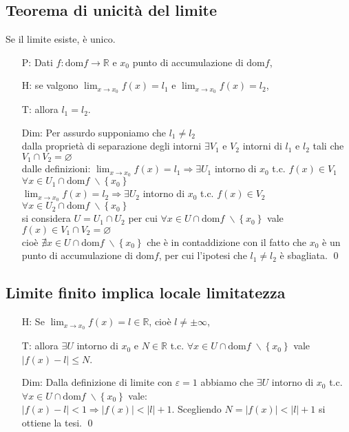 \documentclass[a4paper]{article}
\newcommand\dom{\text{dom}}
\begin{document}
\subsection{Teorema di unicità del limite}
Se il limite esiste, è unico.
\begin{itemize}
	\item[P:] Dati \(f: \dom f \to \mathbb{R}\) e \(x_0\) punto di accumulazione di \(\dom f\),
	\item[H:] se valgono \(\displaystyle \lim_{x \to x_0} f(x) = l_1\) e \(\displaystyle \lim_{x \to x_0} f(x) = l_2\),
	\item[T:] allora \(l_1 = l_2\).
	\item[Dim:] Per assurdo supponiamo che \(l_1 \neq l_2\) \\
	dalla proprietà di separazione degli intorni \(\exists V_1\) e \(V_2\) intorni di \(l_1\) e \(l_2\) tali che \(V_1 \cap V_2 = \varnothing\) \\
	dalle definizioni: \(\lim_{x \to x_0} f(x) = l_1 \Rightarrow \exists U_1\) intorno di \(x_0\) t.c. \(f(x) \in V_1\) \(\forall x \in U_1 \cap \dom f \; \backslash \left\{ x_0 \right\}\) \\
	\(\lim_{x \to x_0} f(x) = l_2 \Rightarrow \exists U_2\) intorno di \(x_0\) t.c. \(f(x) \in V_2\) \(\forall x \in U_2 \cap \dom f \; \backslash \left\{ x_0 \right\}\) \\
	si considera \(U = U_1 \cap U_2\) per cui \(\forall x \in U \cap \dom f \; \backslash \left\{ x_0 \right\}\) vale \(f(x) \in V_1 \cap V_2 = \varnothing\) \\
	cioè \(\nexists x \in U \cap \dom f \; \backslash \left\{ x_0 \right\}\) che è in contaddizione con il fatto che \(x_0\) è un punto di accumulazione di \(\dom f\),
	per cui l'ipotesi che \(l_1 \neq l_2\) è sbagliata. \qed	
\end{itemize}


\subsection{Limite finito implica locale limitatezza}
\begin{itemize}
	\item[H:] Se \(\displaystyle \lim_{x \to x_0} f(x) = l \in \mathbb{R}\), cioè \(l \neq \pm \infty\),
	\item[T:] allora \(\exists U\) intorno di \(x_0\) e \(N \in \mathbb{R}\) t.c. \(\forall x \in U \cap \dom f \; \backslash \left\{ x_0 \right\}\) vale \(\left| f(x) - l \right| \leq N\).
	\item[Dim:] Dalla definizione di limite con \(\varepsilon = 1\) abbiamo che \(\exists U\) intorno di \(x_0\) t.c. \(\forall x \in U \cap \dom f \; \backslash \left\{ x_0 \right\}\) vale: \\
	\(\left| f(x) - l \right| < 1 \Rightarrow \left| f(x) \right| < \left| l \right| + 1\).	Scegliendo \(N = \left| f(x) \right| < \left| l \right| + 1\) si ottiene la tesi. \qed 
\end{itemize}
\end{document}
